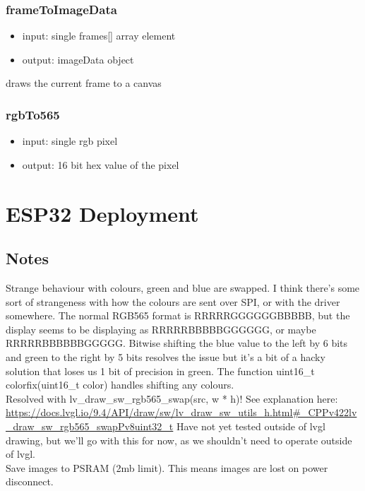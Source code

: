 \documentclass{article}
\begin{document}
\subsubsection{frameToImageData}
\begin{itemize}
\item input: single frames[] array element
\item output: imageData object
\end{itemize}

draws the current frame to a canvas 

\subsubsection{rgbTo565}
\begin{itemize}
\item input: single rgb pixel
\item output: 16 bit hex value of the pixel
\end{itemize}

\section{ESP32 Deployment}

\subsection{Notes}
Strange behaviour with colours, green and blue are swapped. I think there's some sort of strangeness with how the colours are sent over SPI, or with the driver somewhere.
The normal RGB565 format is RRRRRGGGGGGBBBBB, but the display seems to be displaying as RRRRRBBBBBGGGGGG, or maybe RRRRRBBBBBBGGGGG. Bitwise shifting the blue value to the left by 6 bits and green to the right by 5 bits resolves 
the issue but it's a bit of a hacky solution that loses us 1 bit of precision in green. The function uint16\_t colorfix(uint16\_t color) handles shifting any colours.\\
Resolved with lv\_draw\_sw\_rgb565\_swap(src, w * h)! See explanation here: \url{https://docs.lvgl.io/9.4/API/draw/sw/lv_draw_sw_utils_h.html#_CPPv422lv_draw_sw_rgb565_swapPv8uint32_t}
Have not yet tested outside of lvgl drawing, but we'll go with this for now, as we shouldn't need to operate outside of lvgl.\\
Save images to PSRAM (2mb limit). This means images are lost on power disconnect.\\
\end{document}
